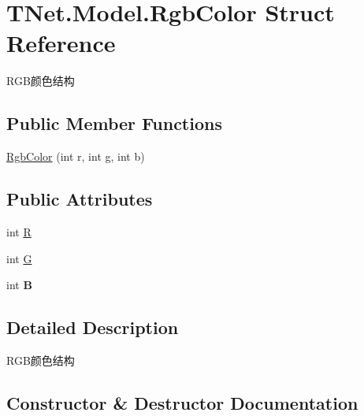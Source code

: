\hypertarget{struct_t_net_1_1_model_1_1_rgb_color}{}\section{T\+Net.\+Model.\+Rgb\+Color Struct Reference}
\label{struct_t_net_1_1_model_1_1_rgb_color}


R\+G\+B颜色结构  


\subsection*{Public Member Functions}
\begin{DoxyCompactItemize}
\item 
\mbox{\hyperlink{struct_t_net_1_1_model_1_1_rgb_color_a5d16ab4855168f4e50c86e0d0b2c0821}{Rgb\+Color}} (int r, int g, int b)
\end{DoxyCompactItemize}
\subsection*{Public Attributes}
\begin{DoxyCompactItemize}
\item 
int \mbox{\hyperlink{struct_t_net_1_1_model_1_1_rgb_color_a17dd621c39c50def55037d4d7e95800f}{R}}
\item 
int \mbox{\hyperlink{struct_t_net_1_1_model_1_1_rgb_color_a156d73c8f72b3b1f2bb38ae37f320de0}{G}}
\item 
\mbox{\label{struct_t_net_1_1_model_1_1_rgb_color_a1235921dbb714107809d3030aa3f1b27}} 
int {\bfseries B}
\end{DoxyCompactItemize}


\subsection{Detailed Description}
R\+G\+B颜色结构 



\subsection{Constructor \& Destructor Documentation}
\mbox{\label{struct_t_net_1_1_model_1_1_rgb_color_a5d16ab4855168f4e50c86e0d0b2c0821}} 

